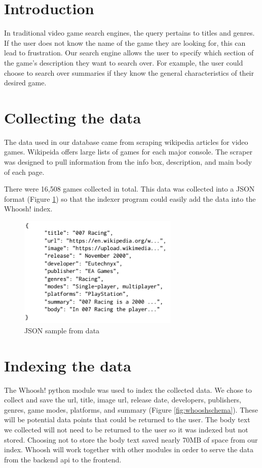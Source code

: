 \section{Introduction}

In traditional video game search engines, the query pertains to titles and genres. If the user does not know the name of the game they are looking for, this can lead to frustration. Our search engine allows the user to specify which section of the game's description they want to search over. For example, the user could choose to search over summaries if they know the general characteristics of their desired game.

\section{Collecting the data}
The data used in our database came from scraping wikipedia articles for video games. Wikipeida offers large lists of games for each major console. The scraper was designed to pull information from the info box, description, and main body of each page.


There were 16,508 games collected in total. This data was collected into a JSON format (Figure \ref{fig:JSONsample}) so that the indexer program could easily add the data into the Whoosh! index. 

\begin{figure}
\includegraphics[width=3in]{jsonEntry}
\caption{JSON sample from data}
\label{fig:JSONsample}
\end{figure}

\section{Indexing the data}
The Whoosh! python module was used to index the collected data. We chose to collect and save the url, title, image url, release date, developers, publishers, genres, game modes, platforms, and summary (Figure \ref{fig:whooshschema}). These will be potential data points that could be returned to the user. The body text we collected will not need to be returned to the user so it was indexed but not stored. Choosing not to store the body text saved nearly 70MB of space from our index. Whoosh will work together with other modules in order to serve the data from the backend api to the frontend.

